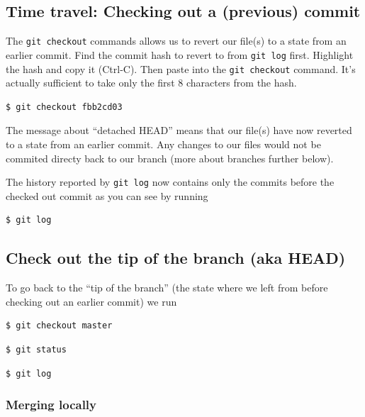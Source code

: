 \documentclass[11pt]{article}
\begin{document}
    \hypertarget{time-travel-checking-out-a-previous-commit}{%
\subsection{Time travel: Checking out a (previous)
commit}\label{time-travel-checking-out-a-previous-commit}}

    The \texttt{git\ checkout} commands allows us to revert our file(s) to a
state from an earlier commit. Find the commit hash to revert to from
\texttt{git\ log} first. Highlight the hash and copy it (Ctrl-C). Then
paste into the \texttt{git\ checkout} command. It's actually sufficient
to take only the first 8 characters from the hash.

    \begin{verbatim}
$ git checkout fbb2cd03
\end{verbatim}

    The message about ``detached HEAD'' means that our file(s) have now
reverted to a state from an earlier commit. Any changes to our files
would not be commited directy back to our branch (more about branches
further below).

    The history reported by \texttt{git\ log} now contains only the commits
before the checked out commit as you can see by running

\begin{verbatim}
$ git log
\end{verbatim}

    \hypertarget{check-out-the-tip-of-the-branch-aka-head}{%
\subsection{Check out the tip of the branch (aka
HEAD)}\label{check-out-the-tip-of-the-branch-aka-head}}

    To go back to the ``tip of the branch'' (the state where we left from
before checking out an earlier commit) we run

    \begin{verbatim}
$ git checkout master
\end{verbatim}

    \begin{verbatim}
$ git status
\end{verbatim}

    \begin{verbatim}
$ git log
\end{verbatim}

    \hypertarget{merging-locally}{%
\subsubsection{Merging locally}\label{merging-locally}}
\end{document}

